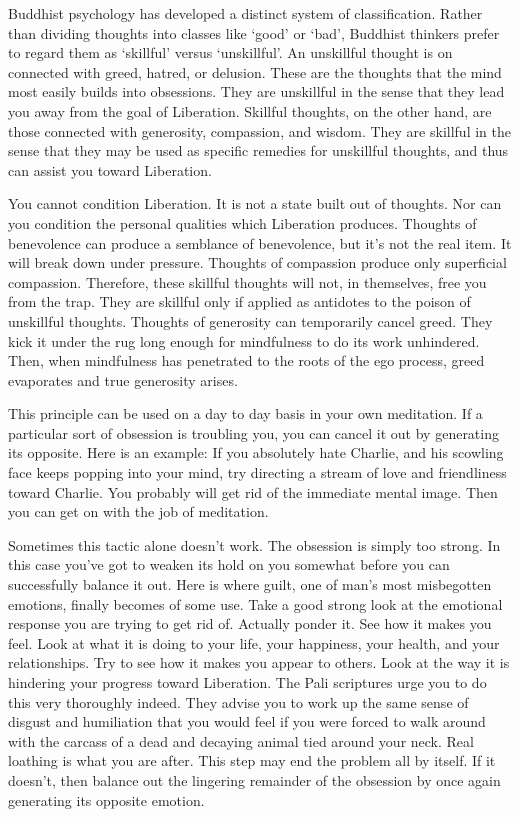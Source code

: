 Buddhist psychology has developed a distinct system of classification. Rather
than dividing thoughts into classes like `good' or `bad', Buddhist thinkers
prefer to regard them as `skillful' versus `unskillful'. An unskillful thought
is on connected with greed, hatred, or delusion. These are the thoughts that the
mind most easily builds into obsessions. They are unskillful in the sense that
they lead you away from the goal of Liberation. Skillful thoughts, on the other
hand, are those connected with generosity, compassion, and wisdom. They are
skillful in the sense that they may be used as specific remedies for unskillful
thoughts, and thus can assist you toward Liberation.

You cannot condition Liberation. It is not a state built out of thoughts. Nor
can you condition the personal qualities which Liberation produces. Thoughts of
benevolence can produce a semblance of benevolence, but it's not the real item.
It will break down under pressure. Thoughts of compassion produce only
superficial compassion. Therefore, these skillful thoughts will not, in
themselves, free you from the trap. They are skillful only if applied as
antidotes to the poison of unskillful thoughts. Thoughts of generosity can
temporarily cancel greed. They kick it under the rug long enough for mindfulness
to do its work unhindered. Then, when mindfulness has penetrated to the roots of
the ego process, greed evaporates and true generosity arises.

This principle can be used on a day to day basis in your own meditation. If a
particular sort of obsession is troubling you, you can cancel it out by
generating its opposite. Here is an example: If you absolutely hate Charlie, and
his scowling face keeps popping into your mind, try directing a stream of love
and friendliness toward Charlie. You probably will get rid of the immediate
mental image. Then you can get on with the job of meditation.

Sometimes this tactic alone doesn't work. The obsession is simply too strong. In
this case you've got to weaken its hold on you somewhat before you can
successfully balance it out. Here is where guilt, one of man's most misbegotten
emotions, finally becomes of some use. Take a good strong look at the emotional
response you are trying to get rid of. Actually ponder it. See how it makes you
feel. Look at what it is doing to your life, your happiness, your health, and
your relationships. Try to see how it makes you appear to others. Look at the
way it is hindering your progress toward Liberation. The Pali scriptures urge
you to do this very thoroughly indeed. They advise you to work up the same sense
of disgust and humiliation that you would feel if you were forced to walk around
with the carcass of a dead and decaying animal tied around your neck. Real
loathing is what you are after. This step may end the problem all by itself. If
it doesn't, then balance out the lingering remainder of the obsession by once
again generating its opposite emotion.

